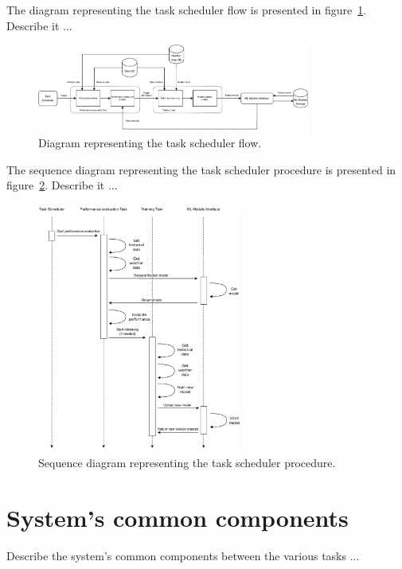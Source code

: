 The diagram representing the task scheduler flow is presented in figure~\ref{fig:schedulerflow}.
Describe it ...

\begin{figure}[H]
\centering 
\includegraphics[width=0.8\textwidth]{images/architecture_scheduler_flow}
\caption{Diagram representing the task scheduler flow.}
\label{fig:schedulerflow}
\end{figure}

The sequence diagram representing the task scheduler procedure is presented in figure~\ref{fig:schedulersequence}.
Describe it ...

\begin{figure}[H]
\centering 
\includegraphics[width=0.6\textwidth]{images/architecture_scheduler_sequence}
\caption{Sequence diagram representing the task scheduler procedure.}
\label{fig:schedulersequence}
\end{figure}


\section{System's common components}
\label{sec:components}
\vspace{0.2 cm}

Describe the system's common components between the various tasks ...

